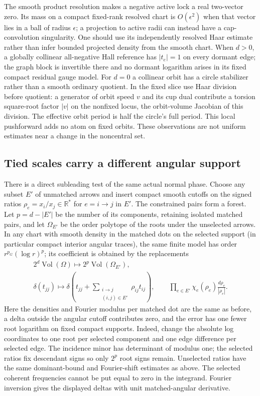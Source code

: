 The smooth product resolution makes a negative active lock
a real two-vector zero. Its mass on a compact fixed-rank
resolved chart is \(O(\epsilon^2)\) when that vector lies
in a ball of radius \(\epsilon\); a projection to active
radii can instead have a cap-convolution singularity.
One should use its independently resolved Haar estimate
rather than infer bounded projected density from the smooth
chart. When \(d>0\), a globally collinear all-negative
Hall reference has \(|t_e|=1\) on every dormant edge;
the graph block is invertible there and no dormant
logarithm arises in its fixed compact residual gauge model.
For \(d=0\) a collinear orbit has a circle stabilizer rather
than a smooth ordinary quotient. In the fixed slice use
Haar division before quotient: a generator of orbit speed
\(v\) and its cup dual contribute a torsion square-root
factor \(|v|\) on the nonfixed locus, the orbit-volume
Jacobian of this division. The effective orbit period is
half the circle's full period. This local pushforward
adds no atom on fixed orbits. These observations are not
uniform estimates near a change in the noncentral set.

\subsection{Tied scales carry a different angular support}
\label{classic:sec:overlap}
There is a direct subleading test of the same actual
normal phase. Choose any subset \(E'\) of unmatched arrows
and insert compact smooth cutoffs on the signed ratios
\(\rho_e=x_i/x_j\in\mathbb R^*\) for \(e=i\to j\) in \(E'\).
The constrained pairs form a forest. Let \(p=d-|E'|\) be
the number of its components, retaining isolated matched
pairs, and let \(\Omega_{E'}\) be the order polytope of the
roots under the unselected arrows. In any chart with smooth
density in the matched dots on the selected support (in
particular compact interior angular traces), the same
finite model has order \(r^{p_G}(\log r)^p\); its
coefficient is obtained by the replacements
\[
 \begin{gathered}
  2^d\operatorname{Vol}(\Omega)
      \longmapsto 2^p\operatorname{Vol}(\Omega_{E'}),\\
  \delta(t_{jj})\longmapsto
  \delta\!\left(t_{jj}+
       \sum_{\substack{i\to j\\(i,j)\in E'}}\rho_{ij}t_{ij}\right),
  \qquad
  \prod_{e\in E'}\chi_e(\rho_e)\frac{d\rho_e}{|\rho_e|}.
 \end{gathered}
\]
Here the densities and Fourier modulus per matched dot
are the same as before, a delta outside the angular
cutoff contributes zero, and the error has one fewer
root logarithm on fixed compact supports. Indeed, change
the absolute log coordinates to one root per selected
component and one edge difference per selected edge.
The incidence minor has determinant of modulus one;
the selected ratios fix descendant signs so only \(2^p\)
root signs remain. Unselected ratios have the same
dominant-bound and Fourier-shift estimates as above.
The selected coherent frequencies cannot be put equal
to zero in the integrand. Fourier inversion gives the
displayed deltas with unit matched-angular derivative.

